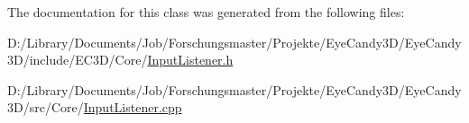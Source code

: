 The documentation for this class was generated from the following files\+:\begin{DoxyCompactItemize}
\item 
D\+:/\+Library/\+Documents/\+Job/\+Forschungsmaster/\+Projekte/\+Eye\+Candy3\+D/\+Eye\+Candy3\+D/include/\+E\+C3\+D/\+Core/\mbox{\hyperlink{_input_listener_8h}{Input\+Listener.\+h}}\item 
D\+:/\+Library/\+Documents/\+Job/\+Forschungsmaster/\+Projekte/\+Eye\+Candy3\+D/\+Eye\+Candy3\+D/src/\+Core/\mbox{\hyperlink{_input_listener_8cpp}{Input\+Listener.\+cpp}}\end{DoxyCompactItemize}
